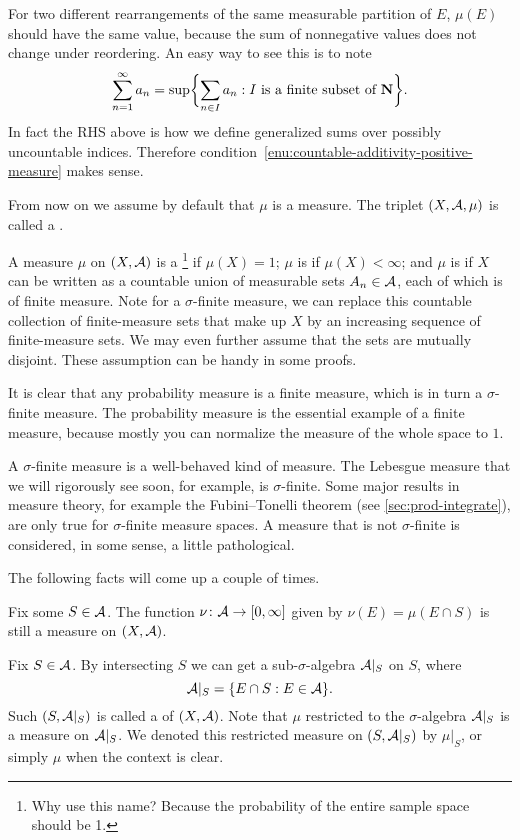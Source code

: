 For two different rearrangements of the same measurable partition of $E$, $\mu(E)$ should have the same value, because the sum of nonnegative values does not change under reordering. An easy way to see this is to note \[
    \sum_{n=1}^\infty a_n= \sup\biggl\{\sum_{n\in I} a_n:I\text{ is a finite subset of }\mathbf{N}\biggr\}.
\] In fact the RHS above is how we define generalized sums over possibly uncountable indices. Therefore condition~\ref{enu:countable-additivity-positive-measure} makes sense.

From now on we assume by default that $\mu$ is a measure. The triplet $(X,\mathcal{A},\mu)$ is called a .

A measure $\mu$ on $(X,\mathcal{A})$ is a \footnote{Why use this name? Because the probability of the entire sample space should be 1.} if $\mu(X) = 1$; $\mu$ is  if $\mu(X) < \infty$; and $\mu$ is  if $X$ can be written as a countable union of measurable sets $A_n \in \mathcal{A}$, each of which is of finite measure. Note for a $\sigma$-finite measure, we can replace this countable collection of finite-measure sets that make up $X$ by an increasing sequence of finite-measure sets. We may even further assume that the sets are mutually disjoint. These assumption can be handy in some proofs.

It is clear that any probability measure is a finite measure, which is in turn a $\sigma$-finite measure. The probability measure is the essential example of a finite measure, because mostly you can normalize the measure of the whole space to $1$.

A $\sigma$-finite measure is a well-behaved kind of measure. The Lebesgue measure that we will rigorously see soon, for example, is $\sigma$-finite. Some major results in measure theory, for example the Fubini--Tonelli theorem (see \cref{sec:prod-integrate}), are only true for $\sigma$-finite measure spaces. A measure that is not $\sigma$-finite is considered, in some sense, a little pathological.

The following facts will come up a couple of times.
\begin{fact} \label{fact:restrict-meausre-original-space}
    Fix some $S \in \mathcal{A}$. The function $\nu\colon \mathcal{A}\to [0,\infty]$ given by $\nu(E) = \mu(E \cap S)$ is still a measure on $(X,\mathcal{A})$.
\end{fact}
\begin{fact} \label{fact:restrict-meausre-restrict-space}
    Fix $S\in \mathcal{A}$. By intersecting $S$ we can get a sub-$\sigma$-algebra $\mathcal{A}|_S$ on $S$, where \[
        \mathcal{A}|_S = \{E \cap S: E\in\mathcal{A}\}.
    \] Such $(S,\mathcal{A}|_S)$ is called a  of $(X,\mathcal{A})$. Note that $\mu$ restricted to the $\sigma$-algebra $\mathcal{A}|_S$ is a measure on $\mathcal{A}|_S$. We denoted this restricted measure on $(S,\mathcal{A}|_S)$ by $\mu|_S$, or simply $\mu$ when the context is clear. 
\end{fact}

